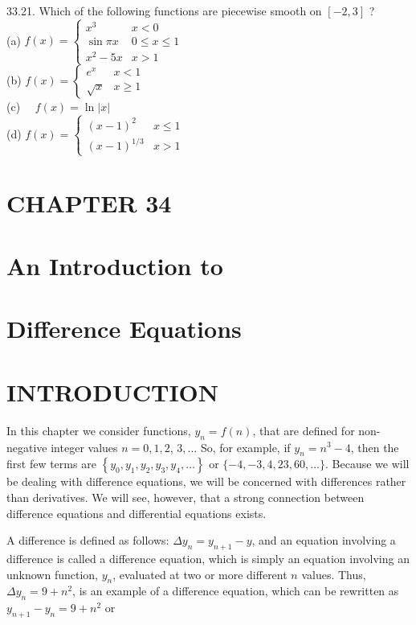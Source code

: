 \documentclass[10pt]{article}
\begin{document}
33.21. Which of the following functions are piecewise smooth on $[-2,3]$ ?\\
(a) $f(x)=\left\{\begin{array}{cr}x^{3} & x<0 \\ \sin \pi x & 0 \leq x \leq 1 \\ x^{2}-5 x & x>1\end{array}\right.$\\
(b) $f(x)= \begin{cases}e^{x} & x<1 \\ \sqrt{x} & x \geq 1\end{cases}$\\
(c) $\quad f(x)=\ln |x|$\\
(d) $f(x)= \begin{cases}(x-1)^{2} & x \leq 1 \\ (x-1)^{1 / 3} & x>1\end{cases}$

\section*{CHAPTER 34}
\section*{An Introduction to}
\section*{Difference Equations}
\section*{INTRODUCTION}
In this chapter we consider functions, $y_{n}=f(n)$, that are defined for non-negative integer values $n=0,1,2$, $3, \ldots$ So, for example, if $y_{n}=n^{3}-4$, then the first few terms are $\left\{y_{0}, y_{1}, y_{2}, y_{3}, y_{4}, \ldots\right\}$ or $\{-4,-3,4,23,60, \ldots\}$. Because we will be dealing with difference equations, we will be concerned with differences rather than derivatives. We will see, however, that a strong connection between difference equations and differential equations exists.

A difference is defined as follows: $\Delta y_{n}=y_{n+1}-y$, and an equation involving a difference is called a difference equation, which is simply an equation involving an unknown function, $y_{n}$, evaluated at two or more different $n$ values. Thus, $\Delta y_{n}=9+n^{2}$, is an example of a difference equation, which can be rewritten as $y_{n+1}-y_{n}=9+n^{2}$ or
\end{document}
